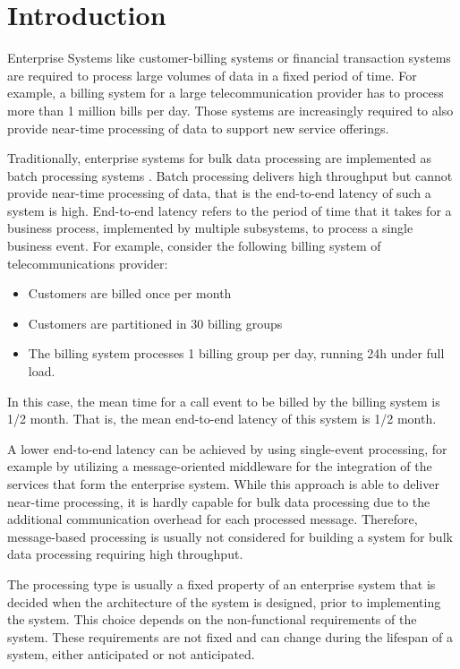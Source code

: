 \chapter{Introduction}\label{ch:introduction}

Enterprise Systems like customer-billing systems or financial transaction systems are required to process large volumes of data in a fixed period of time. For example, a billing system for a large telecommunication provider has to process more than 1 million bills per day.
Those systems are increasingly required to also provide near-time processing of data to support new service offerings.

Traditionally, enterprise systems for bulk data processing are implemented as batch processing systems \citep{Fleck:1999aa}. Batch processing delivers high throughput but cannot provide near-time processing of data, that is the end-to-end latency of such a system is high. End-to-end latency refers to the period of time that it takes for a business process, implemented by multiple subsystems, to process a single business event.  For example, consider the following billing system of telecommunications provider:
\begin{itemize}
	\item Customers are billed once per month
	\item Customers are partitioned in 30 billing groups
	\item The billing system processes 1 billing group per day, running 24h under full load.
\end{itemize}
In this case, the mean time for a call event to be billed by the billing system is 1/2 month. That is, the mean end-to-end latency of this system is 1/2 month.

A lower end-to-end latency can be achieved by using single-event processing, for example by utilizing a message-oriented middleware for the integration of the services that form the enterprise system. While this approach is able to deliver near-time processing, it is hardly capable for bulk data processing due to the additional communication overhead for each processed message. Therefore, message-based processing is usually not considered for building a system for bulk data processing requiring high throughput.

The processing type is usually a fixed property of an enterprise system that is decided when the architecture of the system is designed, prior to implementing the system. This choice depends on the non-functional requirements of the system. These requirements are not fixed and can change during the lifespan of a system, either anticipated or not anticipated.

